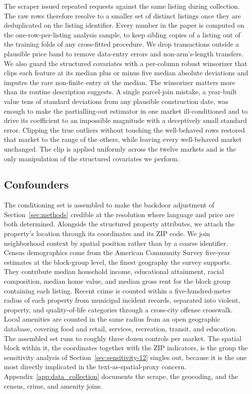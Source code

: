 The scraper issued repeated requests against the same listing during collection.
The raw rows therefore resolve to a smaller set of distinct listings once they are
deduplicated on the listing identifier. Every number in the paper is computed
on the one-row-per-listing analysis sample, to keep sibling copies of a listing out
of the training folds of any cross-fitted procedure. We drop transactions outside a
plausible price band to remove data-entry errors and non-arm's-length transfers.
We also guard the structured covariates with a per-column robust winsorizer that
clips each feature at its median plus or minus five median absolute deviations and
imputes the rare non-finite entry at the median. The winsorizer matters more than
its routine description suggests. A single parcel-join mistake, a year-built value
tens of standard deviations from any plausible construction date, was enough to
make the partialling-out estimator in one market ill-conditioned and to drive its
coefficient to an impossible magnitude with a deceptively small standard error.
Clipping the true outliers without touching the well-behaved rows restored that
market to the range of the others, while leaving every well-behaved market
unchanged. The clip is applied uniformly across the twelve markets and is the only
manipulation of the structured covariates we perform.

\subsection{Confounders}

The conditioning set is assembled to make the backdoor adjustment of
Section~\ref{sec:methods} credible at the resolution where language and price are
both determined. Alongside the structured property attributes, we attach the
property's location through its coordinates and its ZIP code. We join
neighborhood context by spatial position rather than by a coarse identifier. Census
demographics come from the American Community Survey five-year estimates at the
block-group level, the finest geography the survey supports. They contribute median
household income, educational attainment, racial composition, median home value,
and median gross rent for the block group containing each listing. Recent crime is
counted within a five-hundred-meter radius of each property from municipal incident
records, separated into violent, property, and quality-of-life categories through a
cross-city offense crosswalk. Local amenities are counted in the same radius from
an open geographic database, covering food and retail, services, recreation,
transit, and education. The assembled set runs to roughly three dozen controls per
market. The spatial block within it, the coordinates together with the ZIP
indicators, is the group the sensitivity analysis of Section~\ref{sec:sensitivity-12}
singles out, because it is the one most directly implicated in the
text-as-spatial-proxy concern. Appendix~\ref{app:data_collection} documents the
scrape, the geocoding, and the census, crime, and amenity joins.

